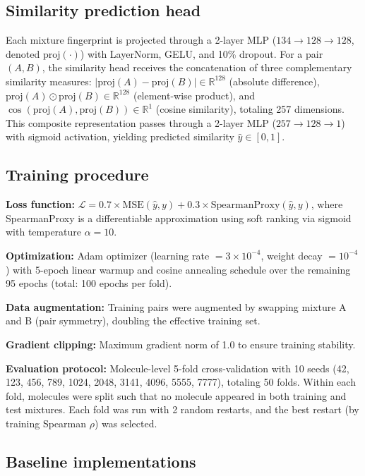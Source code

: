 \documentclass[11pt,a4paper]{article}
\begin{document}
\subsection{Similarity prediction head}

Each mixture fingerprint is projected through a 2-layer MLP ($134 \to 128 \to 128$, denoted $\text{proj}(\cdot)$) with LayerNorm, GELU, and 10\% dropout. For a pair $(A, B)$, the similarity head receives the concatenation of three complementary similarity measures: $|\text{proj}(A) - \text{proj}(B)| \in \mathbb{R}^{128}$ (absolute difference), $\text{proj}(A) \odot \text{proj}(B) \in \mathbb{R}^{128}$ (element-wise product), and $\cos(\text{proj}(A), \text{proj}(B)) \in \mathbb{R}^{1}$ (cosine similarity), totaling 257 dimensions. This composite representation passes through a 2-layer MLP ($257 \to 128 \to 1$) with sigmoid activation, yielding predicted similarity $\hat{y} \in [0, 1]$.

\subsection{Training procedure}

\textbf{Loss function:} $\mathcal{L} = 0.7 \times \text{MSE}(\hat{y}, y) + 0.3 \times \text{SpearmanProxy}(\hat{y}, y)$, where SpearmanProxy is a differentiable approximation using soft ranking via sigmoid~\cite{blondel2020} with temperature $\alpha = 10$.

\textbf{Optimization:} Adam optimizer (learning rate $= 3 \times 10^{-4}$, weight decay $= 10^{-4}$) with 5-epoch linear warmup and cosine annealing schedule over the remaining 95 epochs (total: 100 epochs per fold).

\textbf{Data augmentation:} Training pairs were augmented by swapping mixture A and B (pair symmetry), doubling the effective training set.

\textbf{Gradient clipping:} Maximum gradient norm of 1.0 to ensure training stability.

\textbf{Evaluation protocol:} Molecule-level 5-fold cross-validation with 10 seeds (42, 123, 456, 789, 1024, 2048, 3141, 4096, 5555, 7777), totaling 50 folds. Within each fold, molecules were split such that no molecule appeared in both training and test mixtures. Each fold was run with 2 random restarts, and the best restart (by training Spearman $\rho$) was selected.

\subsection{Baseline implementations}
\end{document}
